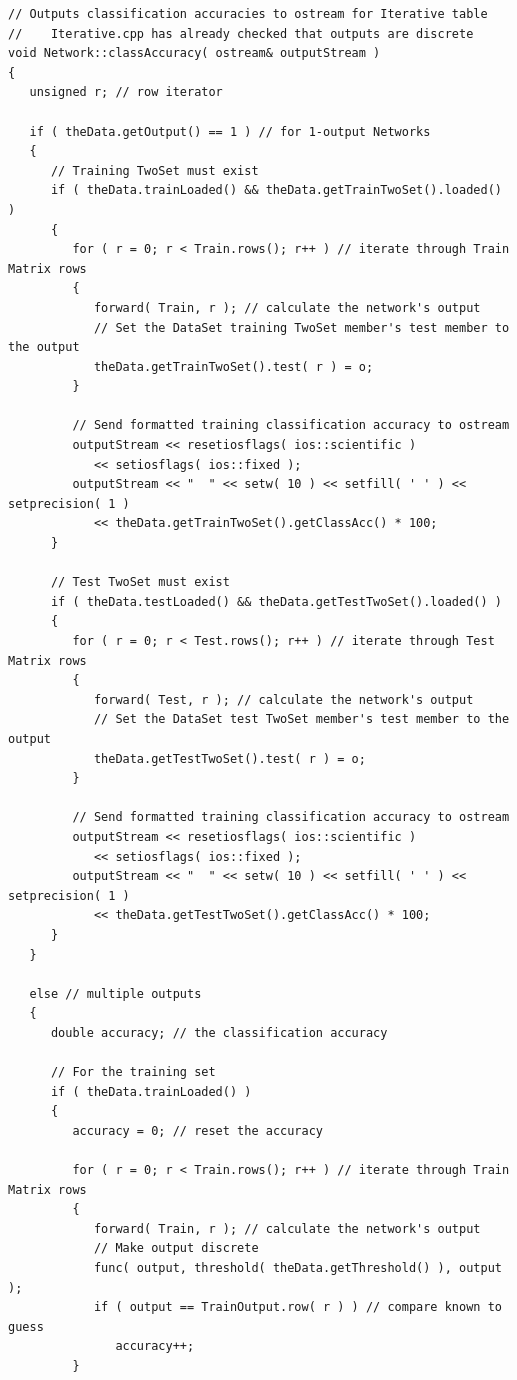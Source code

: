 \documentclass{report}[10pt]
\begin{document}
\begin{verbatim}
// Outputs classification accuracies to ostream for Iterative table
//    Iterative.cpp has already checked that outputs are discrete
void Network::classAccuracy( ostream& outputStream )
{
   unsigned r; // row iterator
   
   if ( theData.getOutput() == 1 ) // for 1-output Networks
   {
      // Training TwoSet must exist
      if ( theData.trainLoaded() && theData.getTrainTwoSet().loaded() )
      {
         for ( r = 0; r < Train.rows(); r++ ) // iterate through Train Matrix rows
         {
            forward( Train, r ); // calculate the network's output
            // Set the DataSet training TwoSet member's test member to the output
            theData.getTrainTwoSet().test( r ) = o;
         }

         // Send formatted training classification accuracy to ostream
         outputStream << resetiosflags( ios::scientific )
            << setiosflags( ios::fixed );
         outputStream << "  " << setw( 10 ) << setfill( ' ' ) << setprecision( 1 )
            << theData.getTrainTwoSet().getClassAcc() * 100;
      }

      // Test TwoSet must exist
      if ( theData.testLoaded() && theData.getTestTwoSet().loaded() )
      {
         for ( r = 0; r < Test.rows(); r++ ) // iterate through Test Matrix rows
         {
            forward( Test, r ); // calculate the network's output
            // Set the DataSet test TwoSet member's test member to the output
            theData.getTestTwoSet().test( r ) = o;
         }

         // Send formatted training classification accuracy to ostream
         outputStream << resetiosflags( ios::scientific )
            << setiosflags( ios::fixed );
         outputStream << "  " << setw( 10 ) << setfill( ' ' ) << setprecision( 1 )
            << theData.getTestTwoSet().getClassAcc() * 100;
      }
   }
   
   else // multiple outputs
   {
      double accuracy; // the classification accuracy

      // For the training set
      if ( theData.trainLoaded() )
      {
         accuracy = 0; // reset the accuracy

         for ( r = 0; r < Train.rows(); r++ ) // iterate through Train Matrix rows
         {
            forward( Train, r ); // calculate the network's output
            // Make output discrete
            func( output, threshold( theData.getThreshold() ), output );
            if ( output == TrainOutput.row( r ) ) // compare known to guess
               accuracy++;
         }


\end{verbatim}
\end{document}
